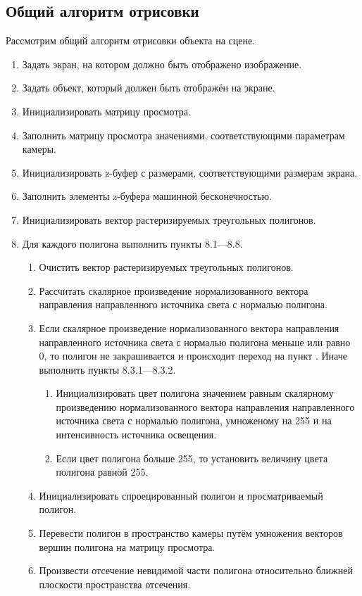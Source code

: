 \subsection{Общий алгоритм отрисовки}
Рассмотрим общий алгоритм отрисовки объекта на сцене.
\begin{enumerate}
\item Задать экран, на котором должно быть отображено изображение.
\item Задать объект, который должен быть отображён на экране.
\item Инициализировать матрицу просмотра.
\item Заполнить матрицу просмотра значениями, соответствующими параметрам камеры.
\item Инициализировать z-буфер с размерами, соответствующими размерам экрана.
\item Заполнить элементы z-буфера машинной бесконечностью.
\item Инициализировать вектор растеризируемых треугольных полигонов.
\item Для каждого полигона выполнить пункты 8.1---8.8.
\begin{enumerate}
\item Очистить вектор растеризируемых треугольных полигонов.
\item Рассчитать скалярное произведение нормализованного вектора направления направленного источника света с нормалью полигона.
\item Если скалярное произведение нормализованного вектора направления направленного источника света с нормалью полигона меньше или равно 0, то полигон не закрашивается и происходит переход на пункт . Иначе выполнить пункты 8.3.1---8.3.2.
\begin{enumerate}
\item Инициализировать цвет полигона значением равным скалярному произведению нормализованного вектора направления направленного источника света с нормалью полигона, умноженому на 255 и на интенсивность источника освещения.
\item Если цвет полигона больше 255, то установить величину цвета полигона равной 255.
\end{enumerate}
\item Инициализировать спроецированный полигон и просматриваемый полигон.
\item Перевести полигон в пространство камеры путём умножения векторов вершин полигона на матрицу просмотра.
\item Произвести отсечение невидимой части полигона относительно ближней плоскости пространства отсечения.

\end{enumerate}
\end{enumerate}
